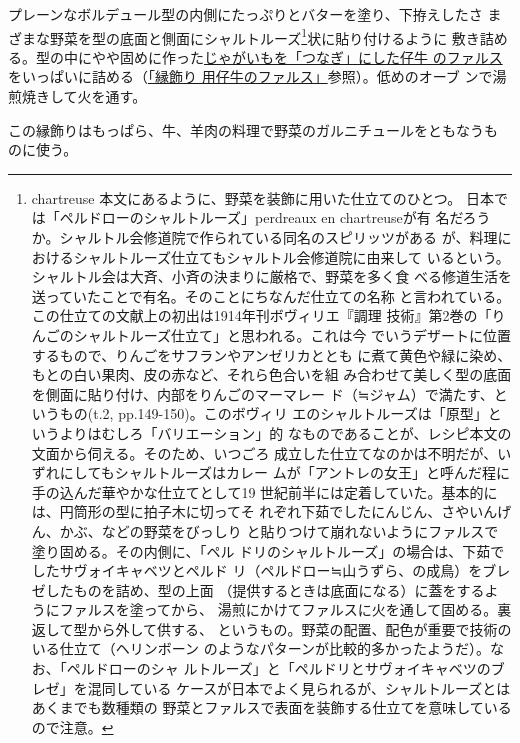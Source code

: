 \begin{recette}
プレーンなボルデュール型の内側にたっぷりとバターを塗り、下拵えしたさ
まざまな野菜を型の底面と側面にシャルトルーズ\footnote{chartreuse
  本文にあるように、野菜を装飾に用いた仕立てのひとつ。
  日本では「ペルドローのシャルトルーズ」perdreaux en chartreuseが有
  名だろうか。シャルトル会修道院で作られている同名のスピリッツがある
  が、料理におけるシャルトルーズ仕立てもシャルトル会修道院に由来して
  いるという。シャルトル会は大斉、小斉の決まりに厳格で、野菜を多く食
  べる修道生活を送っていたことで有名。そのことにちなんだ仕立ての名称
  と言われている。この仕立ての文献上の初出は1914年刊ボヴィリエ『調理
  技術』第2巻の「りんごのシャルトルーズ仕立て」と思われる。これは今
  でいうデザートに位置するもので、りんごをサフランやアンゼリカととも
  に煮て黄色や緑に染め、もとの白い果肉、皮の赤など、それら色合いを組
  み合わせて美しく型の底面を側面に貼り付け、内部をりんごのマーマレー
  ド（≒ジャム）で満たす、というもの(t.2, pp.149-150)。このボヴィリ
  エのシャルトルーズは「原型」というよりはむしろ「バリエーション」的
  なものであることが、レシピ本文の文面から伺える。そのため、いつごろ
  成立した仕立てなのかは不明だが、いずれにしてもシャルトルーズはカレー
  ムが「アントレの女王」と呼んだ程に手の込んだ華やかな仕立てとして19
  世紀前半には定着していた。基本的には、円筒形の型に拍子木に切ってそ
  れぞれ下茹でしたにんじん、さやいんげん、かぶ、などの野菜をびっしり
  と貼りつけて崩れないようにファルスで塗り固める。その内側に、「ペル
  ドリのシャルトルーズ」の場合は、下茹でしたサヴォイキャベツとペルド
  リ（ペルドロー≒山うずら、の成鳥）をブレゼしたものを詰め、型の上面
  （提供するときは底面になる）に蓋をするようにファルスを塗ってから、
  湯煎にかけてファルスに火を通して固める。裏返して型から外して供する、
  というもの。野菜の配置、配色が重要で技術のいる仕立て（ヘリンボーン
  のようなパターンが比較的多かったようだ）。なお、「ペルドローのシャ
  ルトルーズ」と「ペルドリとサヴォイキャベツのブレゼ」を混同している
  ケースが日本でよく見られるが、シャルトルーズとはあくまでも数種類の
  野菜とファルスで表面を装飾する仕立てを意味しているので注意。}状に貼り付けるように
敷き詰める。型の中にやや固めに作った\protect\hyperlink{farce-de-veau-pour-bordures}{じゃがいもを「つなぎ」にした仔牛
のファルス}をいっぱいに詰める（\protect\hyperlink{farce-de-veau-pour-bordures}{「縁飾り
用仔牛のファルス」}参照）。低めのオーブ ンで湯煎焼きして火を通す。

この縁飾りはもっぱら、牛、羊肉の料理で野菜のガルニチュールをともなうも
のに使う。
\end{recette}